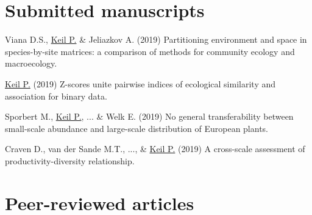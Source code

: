 \newpage

\HRule

\section{Submitted manuscripts}

\begin{etaremune}
\item Viana D.S., \underline{Keil P.} \& Jeliazkov A. (2019) Partitioning environment and space in species-by-site matrices: a comparison of methods for community ecology and macroecology. 

\item \underline{Keil P.} (2019) Z-scores unite pairwise indices of ecological similarity and association for binary data.

\item Sporbert M., \underline{Keil P.}, ... \& Welk E. (2019) No general transferability between small-scale abundance and large-scale distribution of European plants. 

\item Craven D., van der Sande M.T., ..., \& \underline{Keil P.} (2019) A cross-scale assessment of productivity-diversity relationship. 

\end{etaremune}

\section{Peer-reviewed articles}

